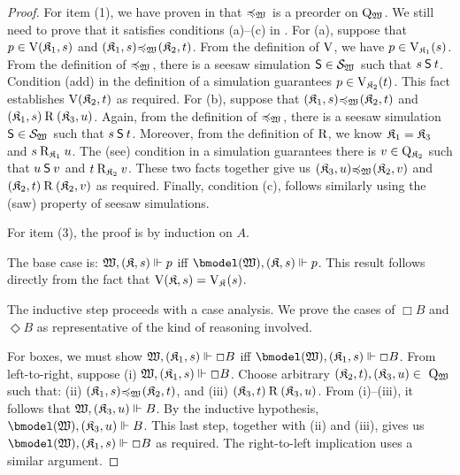 \begin{proof}
    For item (1), we have proven in  that $\Fwm$ is a preorder on $\Qwm$.
    We still need to prove that it satisfies conditions (a)--(c) in .
    For (a), suppose that $p \in \V(\npair {\kmodel_1} s)$ and ${\pair {\kmodel_1} s} \Fwm {\pair {\kmodel_2} t}$.
    From the definition of $\V$, we have $p \in \Vkm[1](s)$.
    From the definition of $\Fwm$, there is a seesaw simulation $\Sim \in \Swm$ such that $s \Sim t$.
    Condition (add) in the definition of a simulation guarantees $p \in \Vkm[2](t)$.
    This fact establishes $\V(\npair {\kmodel_2} t)$ as required.
    For (b), suppose that ${\pair {\kmodel_1} s} \Fwm {\pair {\kmodel_2} t}$ and ${\pair {\kmodel_1} s} \R {\pair {\kmodel_3} u}$.
    Again, from the definition of $\Fwm$, there is a seesaw simulation $\Sim \in \Swm$ such that $s \Sim t$.
    Moreover, from the definition of $\R$, we know $\kmodel_1 = \kmodel_3$ and $s \Rkm[1] u$.
    The (see) condition in a simulation guarantees there is $v \in \Wkm[2]$ such that $u \Sim v$ and $t \Rkm[2] v$.
    These two facts together give us ${\pair {\kmodel_3} u} \Fwm {\pair {\kmodel_2} v}$ and ${\pair {\kmodel_2} t} \R {\pair {\kmodel_2} v}$ as required.
    Finally, condition (c), follows similarly using the (saw) property of seesaw simulations.

    \medskip
    \noindent
    For item (3), the proof is by induction on $A$.

    \medskip
    \noindent
    The base case is: $\wforces {\pair \kmodel s} p$ iff $\xforces {\bmofwm} {\pair{\kmodel}{s}} p$.
    This result follows directly from the fact that $\V(\npair \kmodel s) = \Vkm(s)$.
    
    \medskip
    \noindent
    The inductive step proceeds with a case analysis.
    We prove the cases of $\Box B$ and $\Diamond B$ as representative of the kind of reasoning involved.

    \medskip
    \noindent
    For boxes, we must show $\wforces {\pair {\kmodel_1} s} \Box B$ iff $\xforces {\bmofwm} {\pair{\kmodel_1}{s}} \Box B$.
    From left-to-right, suppose (i) $\wforces {\pair {\kmodel_1} s} \Box B$.
    Choose arbitrary ${\pair {\kmodel_2} t}, {\pair {\kmodel_3} u} \in~\Qwm$ such that:
        (ii) ${\pair {\kmodel_1} s} \Fwm {\pair {\kmodel_2} t}$, and
        (iii) ${\pair {\kmodel_3} t} \R {\pair {\kmodel_3} u}$.
    From (i)--(iii), it follows that $\wforces {\pair {\kmodel_3} u} B$.
    By the inductive hypothesis, $\xforces {\bmofwm} {\pair {\kmodel_3} u} B$.
    This last step, together with (ii) and (iii), gives us $\xforces {\bmofwm} {\pair{\kmodel_1}{s}} \Box B$ as required.
    The right-to-left implication uses a similar argument.


\end{proof}
